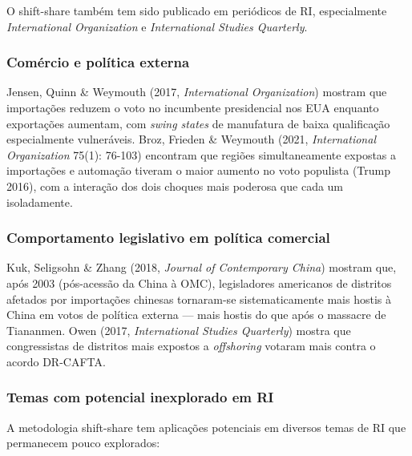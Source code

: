 \documentclass[
]{article}
\begin{document}
O shift-share também tem sido publicado em periódicos de RI, especialmente \emph{International Organization} e \emph{International Studies Quarterly}.

\subsubsection{Comércio e política externa}\label{comuxe9rcio-e-poluxedtica-externa}

Jensen, Quinn \& Weymouth (2017, \emph{International Organization}) mostram que importações reduzem o voto no incumbente presidencial nos EUA enquanto exportações aumentam, com \emph{swing states} de manufatura de baixa qualificação especialmente vulneráveis. Broz, Frieden \& Weymouth (2021, \emph{International Organization} 75(1): 76-103) encontram que regiões simultaneamente expostas a importações e automação tiveram o maior aumento no voto populista (Trump 2016), com a interação dos dois choques mais poderosa que cada um isoladamente.

\subsubsection{Comportamento legislativo em política comercial}\label{comportamento-legislativo-em-poluxedtica-comercial}

Kuk, Seligsohn \& Zhang (2018, \emph{Journal of Contemporary China}) mostram que, após 2003 (pós-acessão da China à OMC), legisladores americanos de distritos afetados por importações chinesas tornaram-se sistematicamente mais hostis à China em votos de política externa --- mais hostis do que após o massacre de Tiananmen. Owen (2017, \emph{International Studies Quarterly}) mostra que congressistas de distritos mais expostos a \emph{offshoring} votaram mais contra o acordo DR-CAFTA.

\subsubsection{Temas com potencial inexplorado em RI}\label{temas-com-potencial-inexplorado-em-ri}

A metodologia shift-share tem aplicações potenciais em diversos temas de RI que permanecem pouco explorados:
\end{document}
